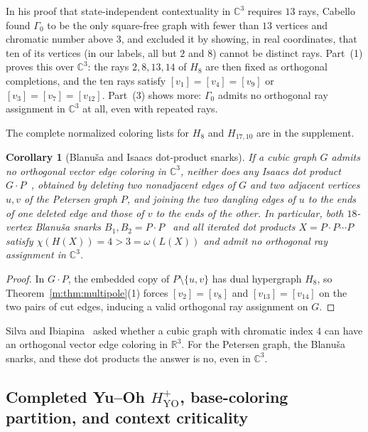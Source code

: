 \documentclass[aps,pra,reprint,superscriptaddress,longbibliography,nofootinbib,floatfix,10pt]{revtex4-2}
\newtheorem{corollary}[theorem]{Corollary}
\theoremstyle{definition}\newtheorem{definition}[theorem]{Definition}
\theoremstyle{remark}\newtheorem{remark}[theorem]{Remark}
\newcommand{\C}{\mathbb C}\newcommand{\R}{\mathbb R}\newcommand{\Q}{\mathbb Q}
\newcommand{\YO}{\mathrm{YO}}\newcommand{\ip}[2]{\langle #1,#2\rangle}
\begin{document}
In his proof that state-independent contextuality in $\C^3$ requires $13$ rays, Cabello~\cite{cabello2012maxnonlocality} found $\Gamma_0$ to be the only square-free graph with fewer than $13$ vertices and chromatic number above $3$, and excluded it by showing, in real coordinates, that ten of its vertices (in our labels, all but $2$ and $8$) cannot be distinct rays. Part~(1) proves this over $\C^3$: the rays $2,8,13,14$ of $H_8$ are then fixed as orthogonal completions, and the ten rays satisfy $[v_1]=[v_4]=[v_9]$ or $[v_3]=[v_7]=[v_{12}]$. Part~(3) shows more: $\Gamma_0$ admits no orthogonal ray assignment in $\C^3$ at all, even with repeated rays.

The complete normalized coloring lists for $H_8$ and $H_{17,10}$ are in the supplement.

\begin{corollary}[Blanu\v{s}a and Isaacs dot-product snarks]\label{m:cor:snarks}
If a cubic graph $G$ admits no orthogonal vector edge coloring in $\C^3$, neither does any Isaacs dot product $G\cdot P$~\cite{isaacs1975infinite}, obtained by deleting two nonadjacent edges of $G$ and two adjacent vertices $u,v$ of the Petersen graph $P$, and joining the two dangling edges of $u$ to the ends of one deleted edge and those of $v$ to the ends of the other. In particular, both $18$-vertex Blanu\v{s}a snarks $B_1,B_2=P\cdot P$~\cite{blanusa1946problem} and all iterated dot products $X=P\cdot P\cdots P$ satisfy $\chi(H(X))=4>3=\omega(L(X))$ and admit no orthogonal ray assignment in $\C^3$.
\end{corollary}
\begin{proof}
In $G\cdot P$, the embedded copy of $P\setminus\{u,v\}$ has dual hypergraph $H_8$, so Theorem~\ref{m:thm:multipole}(1) forces $[v_2]=[v_8]$ and $[v_{13}]=[v_{14}]$ on the two pairs of cut edges, inducing a valid orthogonal ray assignment on $G$.
\end{proof}

Silva and Ibiapina~\cite[Question~6]{silva2019orthogonal} asked whether a cubic graph with chromatic index $4$ can have an orthogonal vector edge coloring in $\R^3$. For the Petersen graph, the Blanu\v{s}a snarks, and these dot products the answer is no, even in $\C^3$.

\subsection{Completed Yu--Oh \texorpdfstring{$H_{\YO}^{+}$}{HYO+}, base-coloring partition, and context criticality}\label{m:sec:yuo}\label{m:sec:ranks}
\end{document}
